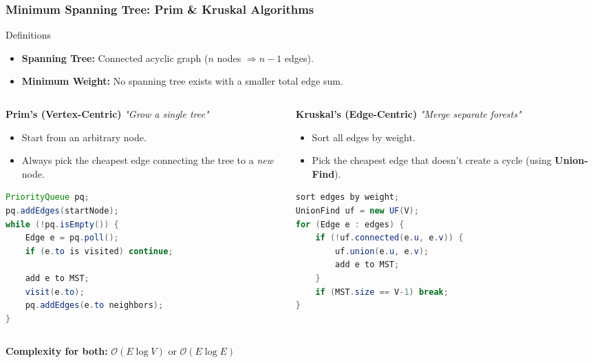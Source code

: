 \documentclass[8pt,aspectratio=169]{beamer}
\begin{document}
\begin{frame}[t, fragile]
\frametitle{Minimum Spanning Tree: Prim \& Kruskal Algorithms}
\begin{block}{Definitions}
    \begin{itemize}
        \item \textbf{Spanning Tree:} Connected acyclic graph ($n$ nodes $\Rightarrow n-1$ edges).
        \item \textbf{Minimum Weight:} No spanning tree exists with a smaller total edge sum.
    \end{itemize}
\end{block}
\begin{columns}[T]
    \begin{column}{0.5\textwidth}
        \textbf{Prim's (Vertex-Centric)}
        \textit{"Grow a single tree"}
        \begin{itemize}
            \item Start from an arbitrary node.
            \item Always pick the cheapest edge connecting the tree to a \textit{new} node.
        \end{itemize}
\begin{lstlisting}[language=Java, basicstyle=\tiny\ttfamily, keywordstyle=\color{blue}, frame=single, title=Prim(G)]
PriorityQueue pq;
pq.addEdges(startNode);
while (!pq.isEmpty()) {
    Edge e = pq.poll();
    if (e.to is visited) continue;
    
    add e to MST;
    visit(e.to);
    pq.addEdges(e.to neighbors);
}
        \end{lstlisting}
    \end{column}

    \begin{column}{0.5\textwidth}
        \textbf{Kruskal's (Edge-Centric)}
        \textit{"Merge separate forests"}
        \begin{itemize}
            \item Sort all edges by weight.
            \item Pick the cheapest edge that doesn't create a cycle (using \textbf{Union-Find}).
        \end{itemize}
\begin{lstlisting}[language=Java, basicstyle=\tiny\ttfamily, keywordstyle=\color{blue}, frame=single, title=Kruskal(G)]
sort edges by weight;
UnionFind uf = new UF(V);
for (Edge e : edges) {
    if (!uf.connected(e.u, e.v)) {
        uf.union(e.u, e.v);
        add e to MST;
    }
    if (MST.size == V-1) break;
}
        \end{lstlisting}
    \end{column}
\end{columns}

\vspace{0.2cm}
\centering
\textbf{Complexity for both:} $\mathcal{O}(E \log V)$ or $\mathcal{O}(E \log E)$
\end{frame}
\end{document}
